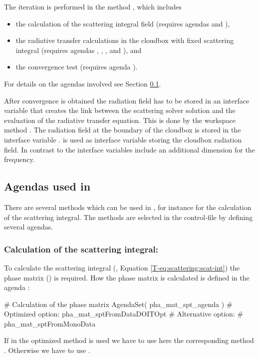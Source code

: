 The iteration is performed in the method
, which includes
\begin{itemize}
\item the calculation of the scattering integral field
 (requires agendas 
and ),
\item the radiative transfer calculations in the cloudbox with fixed scattering
integral (requires agendas ,
, , and
), and
\item the convergence test (requires agenda
).
\end{itemize}
For details on the agendas involved see Section
\ref{sec:scattering:doit_iterate_agendas}.

After convergence is obtained the radiation field has to be stored in an
interface variable that creates the link between the scattering solver solution
and the evaluation of the radiative transfer equation. This is done by the
workspace method .
 The radiation field at the boundary of the cloudbox is
stored in the interface variable .  
 is used as interface
variable storing the cloudbox radiation field. In contrast to
 the interface variables include an additional
dimension for the frequency.

\subsection{Agendas used in }
\label{sec:scattering:doit_iterate_agendas}
There are several methods which can be used in
, for instance for the calculation of
the scattering integral. The methods are selected in the control-file by
defining several agendas.

\subsubsection{Calculation of the scattering integral:}

To calculate the scattering integral (\theory, Equation \ref{T-eq:scattering:scat-int})
the phase matrix () is required. How 
the phase matrix is calculated is defined in the agenda
:
\begin{code}
# Calculation of the phase matrix
AgendaSet( pha_mat_spt_agenda ){
 # Optimized option:
   pha_mat_sptFromDataDOITOpt
 # Alternative option:
 #  pha_mat_sptFromMonoData
}
\end{code}
If in 
the optimized method  is used we
have to use here the corresponding method
. Otherwise we have to use
.

